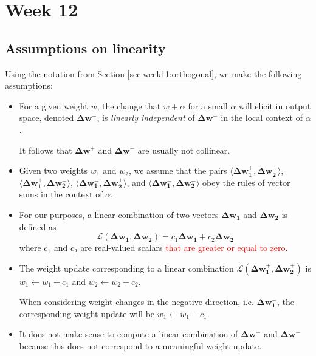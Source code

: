 \documentclass{article}
\renewcommand\vec{\mathbf}
\begin{document}
\section{Week 12}

\subsection{Assumptions on linearity}
Using the notation from Section \ref{sec:week11:orthogonal}, we make the following assumptions: 
\begin{itemize}
    \item For a given weight $w$, the change that $w+\alpha$ for a small $\alpha$ will elicit in output space, denoted $\vec{\Delta w^+}$, is \textit{linearly independent} of $\vec{\Delta w^-}$ in the local context of $\alpha$. 
    
    It follows that $\vec{\Delta w^+}$ and $\vec{\Delta w^-}$ are usually not collinear. 
    \item Given two weights $w_1$ and $w_2$, we assume that the pairs $\langle \vec{\Delta w_1^+, \Delta w_2^+} \rangle$, $\langle \vec{\Delta w_1^+, \Delta w_2^-} \rangle$, $\langle \vec{\Delta w_1^-, \Delta w_2^+} \rangle$, and $\langle \vec{\Delta w_1^-, \Delta w_2^-} \rangle$ obey the rules of vector sums in the context of $\alpha$.

    \item For our purposes, a linear combination of two vectors $\vec{\Delta w_1}$ and $\vec{\Delta w_2}$ is defined as
        $$\vec{\mathcal{L}}(\vec{\Delta w_1}, \vec{\Delta w_2}) = c_1 \vec{\Delta w_1} + c_2 \vec{\Delta w_2}$$
        where $c_1$ and $c_2$ are real-valued scalars \textcolor{red}{that are greater or equal to zero}.
    \item The weight update corresponding to a linear combination $\vec{\mathcal{L}}(\vec{\Delta w_1^+}, \vec{\Delta w_2^+})$ is $w_1 \leftarrow w_1 + c_1$ and $w_2 \leftarrow w_2 + c_2$. 
        
    When considering weight changes in the negative direction, i.e. $\vec{\Delta w_1^-}$, the corresponding weight update will be $w_1 \leftarrow w_1 - c_1$.
    \item It does not make sense to compute a linear combination of $\vec{\Delta w^+}$ and $\vec{\Delta w^-}$ because this does not correspond to a meaningful weight update. 
\end{itemize}


\subsection{}




\end{document}

